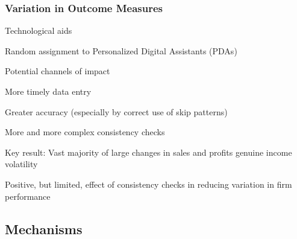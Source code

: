 \documentclass[hideothersubsections, usenames,dvipsnames,11pt]{beamer}
\newenvironment{itemize_2pt}{\itemize\addtolength{\itemsep}{2pt}}{\enditemize}
\newenvironment{enumerate_2pt}{\enumerate\addtolength{\itemsep}{2pt}}{\endenumerate}
\begin{document}

\begin{frame}
\frametitle{Variation in Outcome Measures}
Technological aids \citep{Fafchamps2012}
	\begin{itemize_2pt}
	\item Random assignment to Personalized Digital Assistants (PDAs)
	\item Potential channels of impact
	\begin{enumerate_2pt}
		\item More timely data entry
		\item Greater accuracy (especially by correct use of skip patterns)
		\item More and more complex consistency checks
	
	\end{enumerate_2pt}
	
	\vspace{0.5em}	
	
	\item Key result: \textcolor{bdf}{Vast majority of large changes in sales and profits genuine income volatility}
	\begin{itemize_2pt}
		\item Positive, but limited, effect of consistency checks in reducing variation in firm performance
	\end{itemize_2pt}	
	
\end{itemize_2pt}
\end{frame}


\subsection{Mechanisms}
\end{document}
